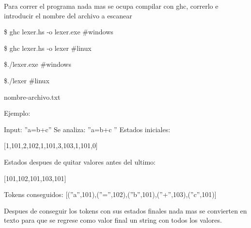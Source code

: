 \documentclass{jhwhw}
\begin{document}
Para correr el programa nada mas se ocupa compilar con ghc, correrlo e introducir el nombre del archivo a escanear

\$ ghc lexer.hs -o lexer.exe \#windows

\$ ghc lexer.hs -o lexer \#linux

\$./lexer.exe \#windows

\$./lexer \#linux

nombre-archivo.txt

\bigskip

Ejemplo:

Input:  ''a=b+c''
Se analiza: ''a=b+c ''
Estados iniciales: 

[1,101,2,102,1,101,3,103,1,101,0]

Estados despues de quitar valores antes del ultimo: 

[101,102,101,103,101]

Tokens conseguidos:
[(''a'',101),(''='',102),(''b'',101),(''+'',103),(''c'',101)]

\bigskip
Despues de conseguir los tokens con sus estados finales nada mas se convierten en texto para que se regrese como valor final un string con todos los valores.
\end{document}
